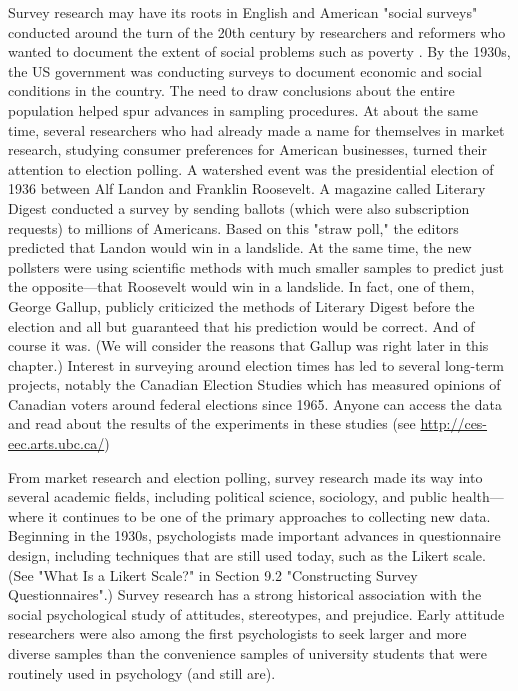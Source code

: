 Survey research may have its roots in English and American "social surveys" conducted around the turn of the 20th century by researchers and reformers who wanted to document the extent of social problems such as poverty \citep{converse_survey_2011}. By the 1930s, the US government was conducting surveys to document economic and social conditions in the country. The need to draw conclusions about the entire population helped spur advances in sampling procedures. At about the same time, several researchers who had already made a name for themselves in market research, studying consumer preferences for American businesses, turned their attention to election polling. A watershed event was the presidential election of 1936 between Alf Landon and Franklin Roosevelt. A magazine called Literary Digest conducted a survey by sending ballots (which were also subscription requests) to millions of Americans. Based on this "straw poll," the editors predicted that Landon would win in a landslide. At the same time, the new pollsters were using scientific methods with much smaller samples to predict just the opposite---that Roosevelt would win in a landslide. In fact, one of them, George Gallup, publicly criticized the methods of Literary Digest before the election and all but guaranteed that his prediction would be correct. And of course it was. (We will consider the reasons that Gallup was right later in this chapter.) Interest in surveying around election times has led to several long-term projects, notably the Canadian Election Studies which has measured opinions of Canadian voters around federal elections since 1965. Anyone can access the data and read about the results of the experiments in these studies (see \url{http://ces-eec.arts.ubc.ca/})

From market research and election polling, survey research made its way into several academic fields, including political science, sociology, and public health---where it continues to be one of the primary approaches to collecting new data. Beginning in the 1930s, psychologists made important advances in questionnaire design, including techniques that are still used today, such as the Likert scale. (See "What Is a Likert Scale?" in Section 9.2 "Constructing Survey Questionnaires".) Survey research has a strong historical association with the social psychological study of attitudes, stereotypes, and prejudice. Early attitude researchers were also among the first psychologists to seek larger and more diverse samples than the convenience samples of university students that were routinely used in psychology (and still are).

